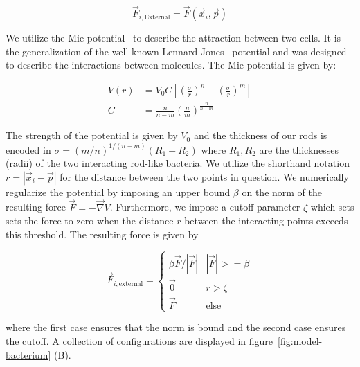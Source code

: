 \begin{equation}
    \vec{F}_{i,\text{External}} = \vec{F}(\vec{x}_i,\vec{p})
\end{equation}

We utilize the Mie potential~\cite{Mie1903} to describe the attraction between two cells.
It is the generalization of the well-known Lennard-Jones~\cite{Jones1924} potential and was designed
to describe the interactions between molecules.
The Mie potential is given by:

\begin{align}
    V(r) &= V_0C\left[ \left(\frac{\sigma}{r}\right)^n -
    \left(\frac{\sigma}{r}\right)^m\right]\\
    C &= \frac{n}{n-m}\left(\frac{n}{m}\right)^{\frac{n}{n-m}}
\end{align}

The strength of the potential is given by $V_0$ and the thickness of our rods
is encoded in $\sigma = (m/n)^{1/(n-m)}(R_1+R_2)$ where $R_1,R_2$ are the thicknesses (radii) of the
two interacting rod-like bacteria.
We utilize the shorthand notation $r=|\vec{x}_i - \vec{p}|$ for the distance between the two points
in question.
We numerically regularize the potential by imposing an upper bound $\beta$ on the norm of the
resulting force $\vec{F} = -\vec{\nabla} V$.
Furthermore, we impose a cutoff parameter $\zeta$ which sets sets the force to zero when the
distance $r$ between the interacting points exceeds this threshold.
The resulting force is given by

\begin{equation}
    \vec{F}_{i,\text{external}} = \left\{
    \begin{array}{ll}
        \beta\vec{F}/|\vec{F}| & |\vec{F}| >= \beta\\
        \vec{0} & r > \zeta\\
        \vec{F} & \text{else}
    \end{array}\right.
\end{equation}

where the first case ensures that the norm is bound and the second case ensures the cutoff.
A collection of configurations are displayed in figure~\ref{fig:model-bacterium} (B).

